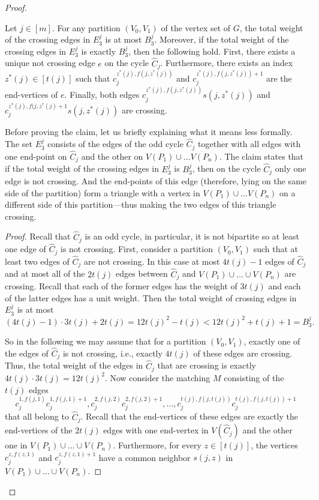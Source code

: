 \documentclass[a4paper,UKenglish,cleveref, autoref, thm-restate]{lipics-v2021}
\begin{document}
\begin{proof}
    \begin{claim}\label{claim:e-3-edges}
         Let $j \in [m]$. For any partition $(V_0, V_1)$ of the vertex set of $G$, the total weight of the crossing edges in $E^j_3$ is at most $B^j_3$. 
         Moreover, if the total weight of the crossing edges in $E^j_3$ is exactly $B^j_3$, then the following hold.
         First, there exists a unique not crossing edge $e$ on the cycle $\hat C_j$.
         Furthermore, there exists an index $z^*(j) \in [t(j)]$ such that $c_j^{z^*(j), f(j, z^*(j))}$ and $c_j^{z^*(j), f(j, z^*(j))+1}$ are the end-vertices of $e$.
         Finally, both edges $c_j^{z^*(j), f(j,z^*(j))} s(j,z^*(j))$ and $c_j^{z^*(j), f(j,z^*(j)+1} s(j,z^*(j))$ 
         are crossing.
    \end{claim}
    Before proving the claim, let us briefly explaining what it means less formally.
    The set $E_3^j$ consists of the edges of the odd cycle $\hat C_j$ together with all edges with one end-point on $\hat C_j$ and the other on $V(P_1) \cup \dots V(P_n)$.
    The claim states that if the total weight of the crossing edges in $E_3^j$ is $B_3^j$, then on the cycle $\hat C_j$ only one edge is not crossing.
    And the end-points of this edge (therefore, lying on the same side of the partition) form a triangle with a vertex in $V(P_1) \cup \dots V(P_n)$ on a different side of this partition---thus making the two edges of this triangle crossing.
    \begin{proof}
        Recall that $\hat C_j$ is an odd cycle, in particular, it is not bipartite so at least one edge of $\hat C_j$ is not crossing.
        First, consider a partition $(V_0, V_1)$ such that at least two edges of $\hat C_j$ are not crossing.
        In this case at most $4t(j) - 1$ edges of $\hat C_j$ and at most all of the $2t(j)$ edges between $\hat C_j$ and $V(P_1) \cup \dots \cup V(P_n)$ are crossing.
        Recall that each of the former edges has the weight of $3t(j)$ and each of the latter edges has a unit weight. 
        Then the total weight of crossing edges in $E^j_3$ is at most
        \[
            (4t(j) - 1) \cdot 3t(j) + 2t(j) = 12t(j)^2 - t(j) < 12t(j)^2 + t(j) + 1 = B_3^j.
        \]

        So in the following we may assume that for a partition $(V_0, V_1)$, exactly one of the edges of $\hat C_j$ is not crossing, i.e., exactly $4t(j)$ of these edges are crossing.
        Thus, the total weight of the edges in $\hat C_j$ that are crossing is exactly $4t(j) \cdot 3t(j) = 12t(j)^2$.
        Now consider the matching $M$ consisting of the $t(j)$ edges 
        \[
            c_j^{1, f(j,1)} c_j^{1, f(j,1)+1}, c_j^{2, f(j,2)} c_j^{2, f(j,2)+1}, \dots, c_j^{t(j), f(j,t(j))} c_j^{t(j), f(j,t(j))+1}
        \]
        that all belong to $\hat C_j$.
        Recall that the end-vertices of these edges are exactly the end-vertices of the $2t(j)$ edges with one end-vertex in $V(\hat C_j)$ and the other one in $V(P_1) \cup \dots \cup V(P_n)$.
        Furthermore, for every $z \in [t(j)]$, the vertices $c_j^{z, f(z,1)}$ and $c_j^{z, f(z,1)+1}$ have a common neighbor $s(j,z)$ in $V(P_1) \cup \dots \cup V(P_n)$.
        

\end{proof}
\end{proof}
\end{document}
